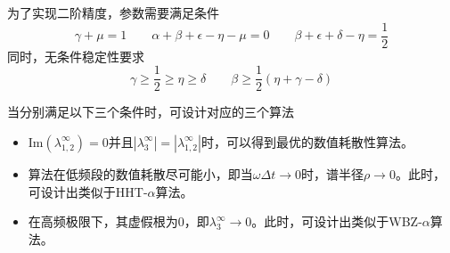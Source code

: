 为了实现二阶精度，参数需要满足条件
\begin{equation}
\gamma+\mu=1\qquad\alpha+\beta+\epsilon-\eta-\mu=0\qquad\beta+\epsilon+\delta-\eta=\frac{1}{2}
\end{equation}
同时，无条件稳定性要求
\begin{equation}
\gamma\ge\frac{1}{2}\ge\eta\ge\delta\qquad\beta\ge\frac{1}{2}(\eta+\gamma-\delta)
\end{equation}

当分别满足以下三个条件时，可设计对应的三个算法
\begin{itemize}
\item[\ddag] Im$(\lambda_{1,2}^{\infty})=0$并且$|\lambda_3^{\infty}|=|\lambda_{1,2}^{\infty}|$时，可以得到最优的数值耗散性算法。
\item[\ddag] 算法在低频段的数值耗散尽可能小，即当$\omega\Delta t\to0$时，谱半径$\rho\to0$。此时，可设计出类似于HHT-$\alpha$算法。
\item[\ddag] 在高频极限下，其虚假根为0，即$\lambda_3^{\infty}\to0$。此时，可设计出类似于WBZ-$\alpha$算法。
\end{itemize}

